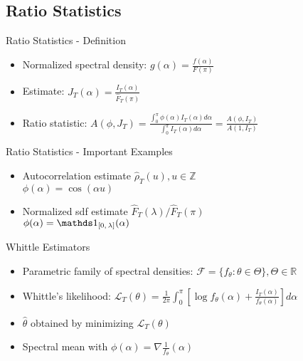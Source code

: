 \subsection{Ratio Statistics}
\begin{frame}{Ratio Statistics - Definition}
\begin{itemize}

\item Normalized spectral density: $g(\alpha)=\frac{f(\alpha)}{F(\pi)}$

\item Estimate: $J_T(\alpha)=\frac{I_T(\alpha)}{\hat{F}_T(\pi)}$

\item Ratio statistic: $A(\phi,J_T)=\frac{\int_0^\pi \phi(\alpha)I_T(\alpha)d\alpha}{\int_0^\pi I_T(\alpha)d\alpha} = \frac{A(\phi,I_T)}{A(1,I_T)}$

\end{itemize}
\end{frame}



\begin{frame}{Ratio Statistics - Important Examples}
\begin{itemize}

\item Autocorrelation estimate $\hat{\rho}_T(u), u \in \mathbb{Z}$\\
$\phi(\alpha)=\cos(\alpha u)$

\item Normalized sdf estimate $\hat{F}_T(\lambda) / \hat{F}_T(\pi)$\\
$\phi(\alpha) = \on{[0,\lambda]}(\alpha)$

\end{itemize}
\end{frame}



\begin{frame}{Whittle Estimators}
\begin{itemize}

\item Parametric family of spectral densities: $\mathcal{F}=\{f_\theta: \theta \in \Theta\}, \Theta \in \mathbb{R}$

\item Whittle's likelihood: $\mathcal{L}_T(\theta) = \frac{1}{2\pi}\int_0^\pi \left[ \log f_\theta (\alpha) + \frac{I_T(\alpha)}{f_\theta(\alpha)} \right]d\alpha$

\item $\hat{\theta}$ obtained by minimizing $\mathcal{L}_T(\theta)$

\item Spectral mean with $\phi(\alpha) = \nabla \frac{1}{f_\theta}(\alpha)$

\end{itemize}
\end{frame}
